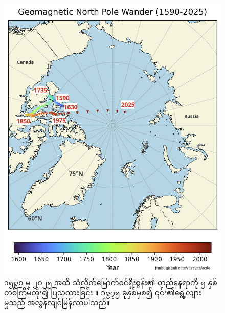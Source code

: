 \documentclass[10pt,twocolumn,letterpaper]{article}
\begin{document}
\begin{figure}[t]
\begin{center}
   \includegraphics[width=1\linewidth]{npw.jpg}
\end{center}
   \caption{၁၅၉၀ မှ ၂၀၂၅ အထိ သံလိုက်မြောက်ဝင်ရိုးစွန်း၏ တည်နေရာကို ၅ နှစ်တစ်ကြိမ်တိုး၍ ပြသထားခြင်း \cite{41}။ ၁၉၇၅ ခုနှစ်မှစ၍ ၎င်း၏ရွေ့လျားမှုသည် အလွန်လျင်မြန်လာပါသည်။}
\label{fig:13}
\label{fig:onecol}
\end{figure}
\end{document}
